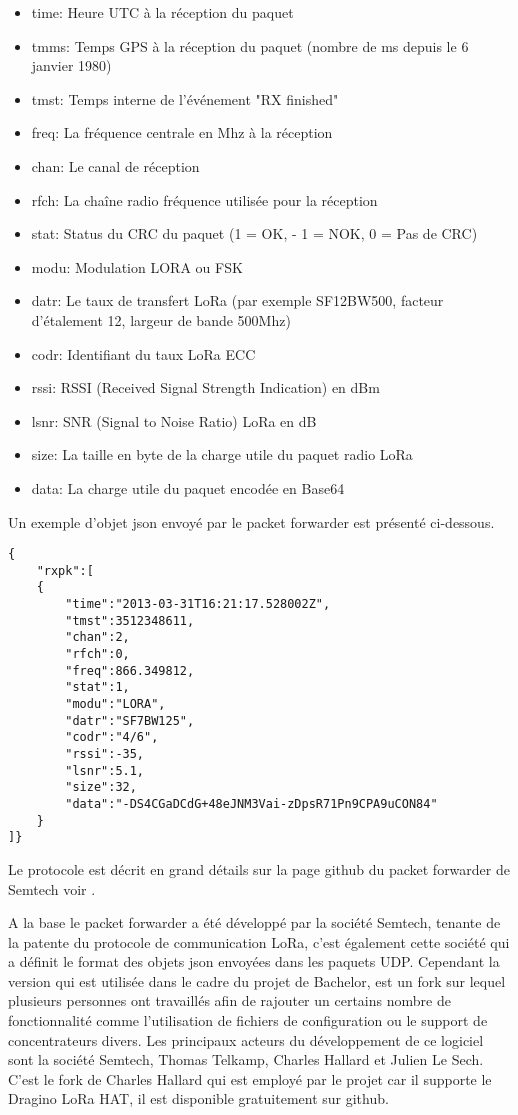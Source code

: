 \begin{itemize}
\item time: Heure UTC à la réception du paquet
\item tmms: Temps GPS à la réception du paquet (nombre de ms depuis le 6 janvier 1980)
\item tmst: Temps interne de l'événement "RX finished"
\item freq: La fréquence centrale en Mhz à la réception
\item chan: Le canal de réception
\item rfch: La chaîne radio fréquence utilisée pour la réception
\item stat: Status du CRC du paquet (1 = OK, - 1 = NOK, 0 = Pas de CRC)
\item modu: Modulation LORA ou FSK
\item datr: Le taux de transfert LoRa (par exemple SF12BW500, facteur d'étalement 12, largeur de bande 500Mhz)
\item codr: Identifiant du taux LoRa ECC
\item rssi: RSSI (Received Signal Strength Indication) en dBm
\item lsnr: SNR (Signal to Noise Ratio) LoRa en dB
\item size: La taille en byte de la charge utile du paquet radio LoRa
\item data: La charge utile du paquet encodée en Base64
\end{itemize}

Un exemple d'objet json envoyé par le packet forwarder est présenté ci-dessous.

\begin{lstlisting}
{
	"rxpk":[
	{
		"time":"2013-03-31T16:21:17.528002Z",
		"tmst":3512348611,
		"chan":2,
		"rfch":0,
		"freq":866.349812,
		"stat":1,
		"modu":"LORA",
		"datr":"SF7BW125",
		"codr":"4/6",
		"rssi":-35,
		"lsnr":5.1,
		"size":32,
		"data":"-DS4CGaDCdG+48eJNM3Vai-zDpsR71Pn9CPA9uCON84"
	}
]}
\end{lstlisting}

Le protocole est décrit en grand détails sur la page github du packet forwarder de Semtech voir \cite{lora-pkt-forwarder-protocol}.

A la base le packet forwarder a été développé par la société Semtech, tenante de la patente du protocole de communication LoRa, c'est également cette société qui a définit le format des objets json envoyées dans les paquets UDP. Cependant la version qui est utilisée dans le cadre du projet de Bachelor, est un fork sur lequel plusieurs personnes ont travaillés afin de rajouter un certains nombre de fonctionnalité comme l'utilisation de fichiers de configuration ou le support de concentrateurs divers. Les principaux acteurs du développement de ce logiciel sont la société Semtech, Thomas Telkamp, Charles Hallard et Julien Le Sech. C'est le fork de Charles Hallard qui est employé par le projet car il supporte le Dragino LoRa HAT, il est disponible gratuitement sur github. \cite{pkt-forwarder-hallard}

